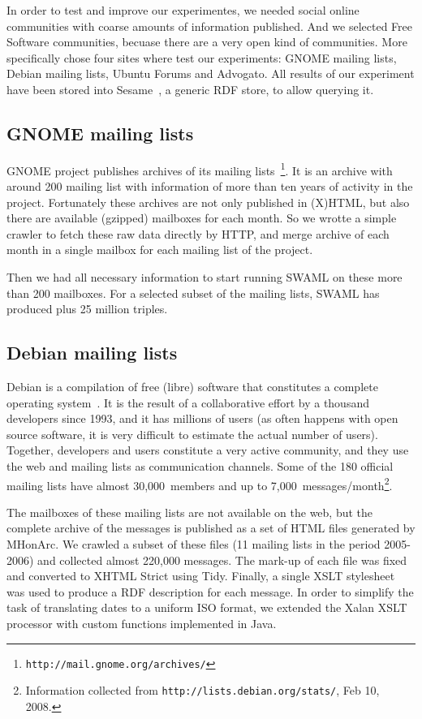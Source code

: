 \documentclass{../templates/www2008-submission}
\begin{document}
In order to test and improve our experimentes, we needed social
online communities with coarse amounts of information published.
And we selected Free Software communities, becuase there are a very
open kind of communities. More specifically chose four sites where
test our experiments: GNOME mailing lists, Debian mailing lists,
Ubuntu Forums and Advogato. All results of our experiment have been
stored into Sesame~\cite{Broekstra2002}, a generic RDF store, to
allow querying it.

\subsection{\label{sec:gnome}GNOME mailing lists}

GNOME project publishes archives of its mailing lists~\footnote{\texttt{http://mail.gnome.org/archives/}}.
It is an archive with around 200 mailing list with information of 
more than ten years of activity in the project. Fortunately these
archives are not only published in (X)HTML, but also there are 
available (gzipped) mailboxes for each month. So we wrotte a simple
crawler to fetch these raw data directly by HTTP, and merge archive
of each month in a single mailbox for each mailing list of the project.

Then we had all necessary information to start running SWAML on these 
more than 200 mailboxes. For a selected subset of the mailing lists, 
SWAML has produced plus 25 million triples.

\subsection{Debian mailing lists}

Debian is a compilation of free (libre) software that constitutes a
complete operating system~\cite{Krafft2005}. It is the result of a
collaborative effort by a thousand developers since 1993, and it has
millions of users (as often happens with open source software, it is very
difficult to estimate the actual number of users). Together, developers
and users constitute a very active community, and they use the web and
mailing lists as communication channels. Some of the 180 official mailing
lists have almost 30,000~members and up to
7,000~messages/month\footnote{Information collected from \texttt{http://lists.debian.org/stats/}, Feb 10, 2008.}.

The mailboxes of these mailing lists are not available on the web, but
the complete archive of the messages is published as a set of
HTML files generated by MHonArc. We crawled a subset of these files
(11 mailing lists in the period 2005-2006) and collected almost 220,000
messages. The mark-up of each file was fixed and converted to XHTML Strict
using Tidy. Finally, a single XSLT stylesheet was used to produce a
RDF description for each message. In order to simplify the
task of translating dates to a uniform ISO format, we extended
the Xalan XSLT processor with custom functions implemented in Java.
\end{document}

